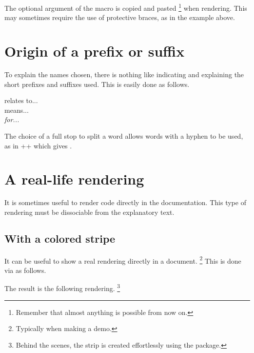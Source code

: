 \begin{tdocwarn}
    The optional argument of the  macro is copied and pasted
    \footnote{
        Remember that almost anything is possible from now on.
    }
    when rendering. This may sometimes require the use of protective braces, as in the example above.
\end{tdocwarn}



\section{Origin of a prefix or suffix}

To explain the names chosen, there is nothing like indicating and explaining the short prefixes and suffixes used. This is easily done as follows.


\begin{tdoclatex}[sbs]
 relates to...      \\
 means...   \\
\emph{ for...}
\end{tdoclatex}


\begin{tdocrem}
    The choice of a full stop to split a word allows words with a hyphen to be used, as in \tdoclatexin++ which gives .
\end{tdocrem}


\section{A real-life rendering}
\label{tutodoc-showcase}

It is sometimes useful to render code directly in the documentation. This type of rendering must be dissociable from the explanatory text.



\subsection{With a colored stripe}

\begin{tdocexa} 
    It can be useful to show a real rendering directly in a document.
    \footnote{
        Typically when making a demo.
    }
    This is done via  as follows.



    The result is the following rendering.
    \footnote{
        Behind the scenes, the strip is created effortlessly using the  package.
    }
\end{tdocexa}

